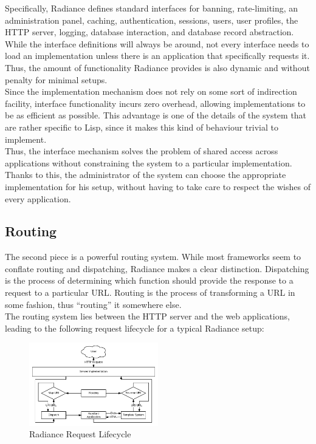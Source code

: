 \documentclass{sig-alternate}
\begin{document}
Specifically, Radiance defines standard interfaces for banning, rate-limiting, an administration panel, caching, authentication, sessions, users, user profiles, the HTTP server, logging, database interaction, and database record abstraction. While the interface definitions will always be around, not every interface needs to load an implementation unless there is an application that specifically requests it. Thus, the amount of functionality Radiance provides is also dynamic and without penalty for minimal setups. \\

Since the implementation mechanism does not rely on some sort of indirection facility, interface functionality incurs zero overhead, allowing implementations to be as efficient as possible. This advantage is one of the details of the system that are rather specific to Lisp, since it makes this kind of behaviour trivial to implement. \\

Thus, the interface mechanism solves the problem of shared access across applications without constraining the system to a particular implementation. Thanks to this, the administrator of the system can choose the appropriate implementation for his setup, without having to take care to respect the wishes of every application. \\

\subsection{Routing}
The second piece is a powerful routing system. While most frameworks seem to conflate routing and dispatching, Radiance makes a clear distinction. Dispatching is the process of determining which function should provide the response to a request to a particular URL. Routing is the process of transforming a URL in some fashion, thus ``routing'' it somewhere else. \\

The routing system lies between the HTTP server and the web applications, leading to the following request lifecycle for a typical Radiance setup: \\

\begin{figure}[H]
  \centering
  \includegraphics[width=0.5\textwidth]{request.pdf}
  \caption{Radiance Request Lifecycle}
\end{figure}
\end{document}

